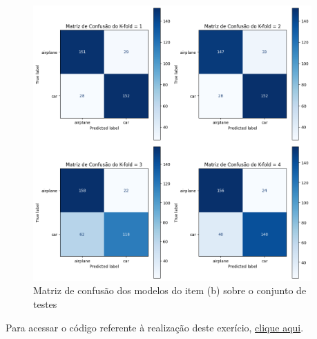 \documentclass[]{abntex2}
\begin{document}
\begin{figure}[H]
    \centering 
    \includegraphics[width=0.95\textwidth]{imgs/ex3/conf4.png}
    \caption{Matriz de confusão dos modelos do item (b) sobre o conjunto de testes}
    \label{fig:conf4} %
\end{figure}

Para acessar o código referente à realização deste exerício, \href{https://github.com/lorran-araujo/LNCC/blob/main/disciplinas/redes-neurais/codes/lista3/exercicio3.ipynb}{clique aqui}.


\end{document}
